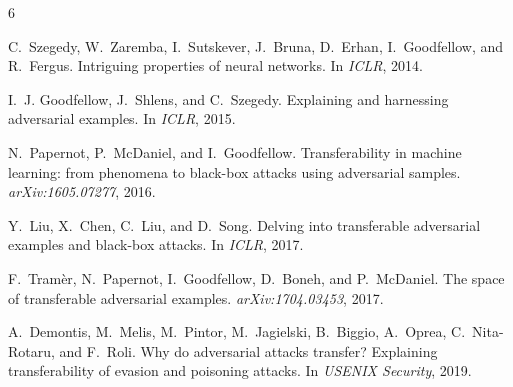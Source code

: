 \documentclass[11pt,a4paper]{article}
\begin{document}

\begin{thebibliography}{6}

C.~Szegedy, W.~Zaremba, I.~Sutskever, J.~Bruna, D.~Erhan, I.~Goodfellow, and R.~Fergus.
\newblock Intriguing properties of neural networks.
\newblock In \emph{ICLR}, 2014.

I.~J. Goodfellow, J.~Shlens, and C.~Szegedy.
\newblock Explaining and harnessing adversarial examples.
\newblock In \emph{ICLR}, 2015.

N.~Papernot, P.~McDaniel, and I.~Goodfellow.
\newblock Transferability in machine learning: from phenomena to black-box attacks using adversarial samples.
\newblock \emph{arXiv:1605.07277}, 2016.

Y.~Liu, X.~Chen, C.~Liu, and D.~Song.
\newblock Delving into transferable adversarial examples and black-box attacks.
\newblock In \emph{ICLR}, 2017.

F.~Tram{\`e}r, N.~Papernot, I.~Goodfellow, D.~Boneh, and P.~McDaniel.
\newblock The space of transferable adversarial examples.
\newblock \emph{arXiv:1704.03453}, 2017.

A.~Demontis, M.~Melis, M.~Pintor, M.~Jagielski, B.~Biggio, A.~Oprea, C.~Nita-Rotaru, and F.~Roli.
\newblock Why do adversarial attacks transfer? {E}xplaining transferability of evasion and poisoning attacks.
\newblock In \emph{USENIX Security}, 2019.

\end{thebibliography}
\end{document}
